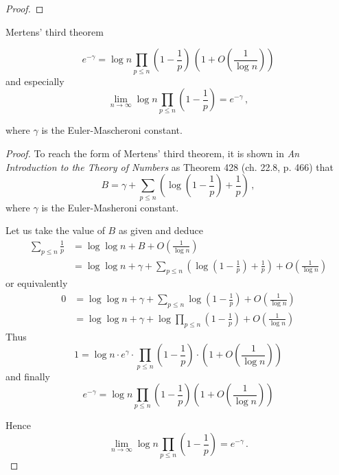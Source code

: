 \documentclass{article}
\begin{document}
\begin{theorem}
\begin{proof}
\end{proof}

\end{theorem}

\begin{theorem}
Mertens' third theorem \emph{\cite{HardyWright}}
\label{thm:mertens3}

\begin{equation*}
    e^{-\gamma} = \log n \prod_{p\le n} \left(1-\frac{1}{p}\right)\,\left(1+O\left(\frac{1}{\log n}\right)\right)
\end{equation*}
and especially
\begin{equation*}
    \lim_{n \rightarrow \infty} \log n \prod_{p\leq n} \left(1-\frac{1}{p}\right) = e^{-\gamma}\,,
\end{equation*}

where $\gamma$ is the Euler-Mascheroni constant.

\begin{proof}
To reach the form of Mertens' third theorem, it is shown in \textit{An Introduction to the Theory of Numbers} \cite{HardyWright} as Theorem 428 (ch. 22.8, p. 466) that
\begin{equation*}
    B = \gamma + \sum_{p\leq n} \left(\log \left(1-\frac{1}{p}\right)+\frac{1}{p}\right)\,,
\end{equation*}
where $\gamma$ is the Euler-Masheroni constant.

Let us take the value of $B$ as given and deduce
\begin{align*}
    \sum_{p\leq n} \frac{1}{p} & = \log\log n + B + O\left(\frac{1}{\log n}\right)\\
    & = \log\log n + \gamma + \sum_{p\leq n} \left(\log \left(1-\frac{1}{p}\right)+\frac{1}{p}\right) + O\left(\frac{1}{\log n}\right)
\end{align*}
or equivalently
\begin{align*}
    0 & = \log\log n + \gamma + \sum_{p\leq n} \log \left(1-\frac{1}{p}\right) + O\left(\frac{1}{\log n}\right)\\
    & = \log\log n + \gamma + \log \prod_{p\leq n} \left(1-\frac{1}{p}\right) + O\left(\frac{1}{\log n}\right)
\end{align*}
Thus
\begin{equation*}
    1 = \log n \cdot e^\gamma \cdot \prod_{p\leq n} \left(1-\frac{1}{p}\right) \cdot \left(1+O\left(\frac{1}{\log n}\right)\right)
\end{equation*}
and finally
\begin{equation*}
    e^{-\gamma} = \log n \prod_{p\le n} \left(1-\frac{1}{p}\right) \left(1+O\left(\frac{1}{\log n}\right)\right)
\end{equation*}

Hence
\begin{equation*}
    \lim_{n \rightarrow \infty} \log n \prod_{p\leq n} \left(1-\frac{1}{p}\right) = e^{-\gamma}\,.
\end{equation*}
\end{proof}

\end{theorem}
\end{document}
